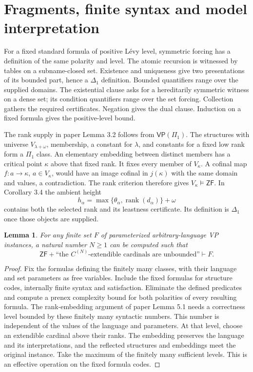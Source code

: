 \documentclass[11pt,a4paper]{amsart}
\newcommand{\ZF}{\ensuremath{\mathsf{ZF}}}
\newcommand{\VP}{\ensuremath{\mathsf{VP}}}
\newcommand{\rank}{\ensuremath{\operatorname{rank}}}
\newtheorem{lemma}[theorem]{Lemma}
\begin{document}
\section{Fragments, finite syntax and model interpretation}\label{sec:syntax}
For a fixed standard formula of positive L\'evy level, symmetric forcing has a definition of the same polarity and level. The atomic recursion is witnessed by tables on a subname-closed set. Existence and uniqueness give two presentations of its bounded part, hence a $\Delta_1$ definition. Bounded quantifiers range over the supplied domains. The existential clause asks for a hereditarily symmetric witness on a dense set; its condition quantifiers range over the set forcing. Collection gathers the required certificates. Negation gives the dual clause. Induction on a fixed formula gives the positive-level bound.

The rank supply in paper Lemma 3.2 follows from $\VP(\Pi_1)$. The structures with universe $V_{\lambda+\omega}$, membership, a constant for $\lambda$, and constants for a fixed low rank form a $\Pi_1$ class. An elementary embedding between distinct members has a critical point $\kappa$ above that fixed rank. It fixes every member of $V_\kappa$. A cofinal map $f:a\to\kappa$, $a\in V_\kappa$, would have an image cofinal in $j(\kappa)$ with the same domain and values, a contradiction. The rank criterion therefore gives $V_\kappa\models\ZF$. In Corollary 3.4 the ambient height
\[
h_\alpha=\max\{\theta_\alpha,\rank(d_\alpha)\}+\omega
\]
contains both the selected rank and its leastness certificate. Its definition is $\Delta_1$ once those objects are supplied.

\begin{lemma}\label{lem:finite}
For any finite set $F$ of parameterized arbitrary-language VP instances, a natural number $N\geq1$ can be computed such that
\[
\ZF+\text{``the $C^{(N)}$-extendible cardinals are unbounded''}\vdash F.
\]
\end{lemma}
\begin{proof}
Fix the formulas defining the finitely many classes, with their language and set parameters as free variables. Include the fixed formulas for structure codes, internally finite syntax and satisfaction. Eliminate the defined predicates and compute a prenex complexity bound for both polarities of every resulting formula. The rank-embedding argument of paper Lemma 5.1 needs a correctness level bounded by these finitely many syntactic numbers. This number is independent of the values of the language and parameters. At that level, choose an extendible cardinal above their ranks. The embedding preserves the language and its interpretations, and the reflected structures and embeddings meet the original instance. Take the maximum of the finitely many sufficient levels. This is an effective operation on the fixed formula codes.
\end{proof}
\end{document}
